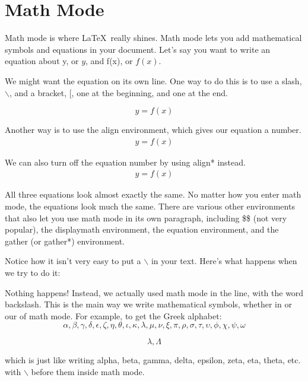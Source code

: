 \documentclass{article}
\begin{document}
\section{Math Mode}

Math mode is where \LaTeX\ really shines. Math mode lets you add mathematical symbols and equations in your document. Let's say you want to write an equation about y, or $y$, and f(x), or $f(x)$.


We might want the equation on its own line. One way to do this is to use a slash, $\backslash$, and a bracket, [, one at the beginning, and one at the end.

\[
y=f(x)
\]

Another way is to use the align environment, which gives our equation a number.
\begin{align}
y=f(x)
\end{align}

We can also turn off the equation number by using align* instead.
\begin{align*}
y=f(x)
\end{align*}

All three equations look almost exactly the same. No matter how you enter math mode, the equations look much the same. There are various other environments that also let you use math mode in its own paragraph, including \$\$ (not very popular), the displaymath environment, the equation environment, and the gather (or gather*) environment.

Notice how it isn't very easy to put a $\backslash$ in your text. Here's what happens when we try to do it: \

Nothing happens! Instead, we actually used math mode in the line, with the word backslash. This is the main way we write mathematical symbols, whether in or our of math mode. For example, to get the Greek alphabet:
\[ 
\alpha, \beta, \gamma, \delta, \epsilon, \zeta, \eta, \theta, \iota, \kappa, \lambda, \mu, \nu, \xi, \pi, \rho, \sigma, \tau, \upsilon, \phi, \chi, \psi, \omega 
\]

\[
\lambda, \Lambda
\]

which is just like writing alpha, beta, gamma, delta, epsilon, zeta, eta, theta, etc. with $\backslash$ before them inside math mode. 

\end{document}
